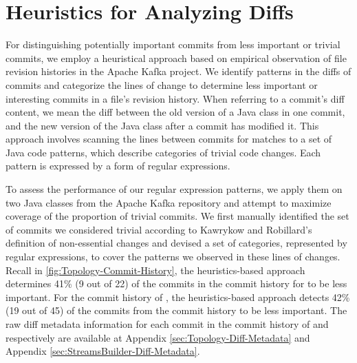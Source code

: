 \section{Heuristics for Analyzing Diffs}
\label{sec:Heuristics}

For distinguishing potentially important commits from less important or trivial commits, we employ a heuristical approach based on empirical observation of file revision histories in the Apache Kafka project.
We identify patterns in the diffs of commits and categorize the lines of change to determine less important or interesting commits in a file's revision history.
When referring to a commit's diff content, we mean the diff between the old version of a Java class in one commit, and the new version of the Java class after a commit has modified it.
This approach involves scanning the lines between commits for matches to a set of Java code patterns, which describe categories of trivial code changes.
Each pattern is expressed by a form of regular expressions.

To assess the performance of our regular expression patterns, we apply them on two Java classes from the Apache Kafka repository and attempt to maximize coverage of the proportion of trivial commits.
We first manually identified the set of commits we considered trivial according to Kawrykow and Robillard's definition of non-essential changes \cite{kawrykow_non-essential_2011} and devised a set of categories, represented by regular expressions, to cover the patterns we observed in these lines of changes.
Recall in \autoref{fig:Topology-Commit-History}, the heuristics-based approach determines 41\% (9 out of 22) of the commits in the commit history for  to be less important.
For the commit history of , the heuristics-based approach detects 42\% (19 out of 45) of the commits from the commit history to be less important.
The raw diff metadata information for each commit in the commit history of  and  respectively are available at Appendix \ref{sec:Topology-Diff-Metadata} and Appendix \ref{sec:StreamsBuilder-Diff-Metadata}.

